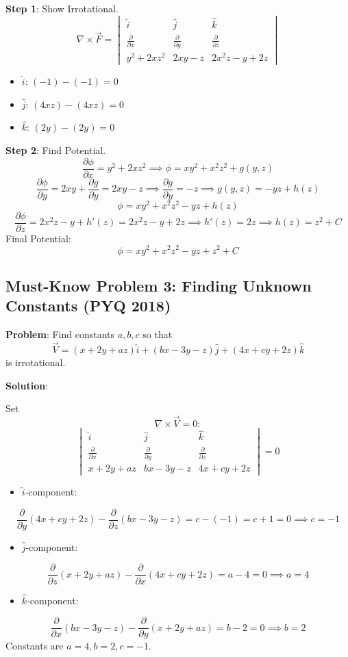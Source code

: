 \documentclass[
]{article}
\providecommand{\tightlist}{%
  \setlength{\itemsep}{0pt}\setlength{\parskip}{0pt}}
\begin{document}
\textbf{Step 1}: Show Irrotational.
\[
\nabla \times \vec{F} =
\begin{vmatrix}
\hat{i} & \hat{j} & \hat{k} \\
\frac{\partial}{\partial x} & \frac{\partial}{\partial y} & \frac{\partial}{\partial z} \\
y^2 + 2xz^2 & 2xy - z & 2x^2z - y + 2z
\end{vmatrix}
\]
\begin{itemize}
\tightlist
\item
  \(\hat{i}\): \((-1) - (-1) = 0\)
\item
  \(\hat{j}\): \((4xz) - (4xz) = 0\)
\item
  \(\hat{k}\): \((2y) - (2y) = 0\)
\end{itemize}

\textbf{Step 2}: Find Potential.
\[
\frac{\partial\phi}{\partial x} = y^2 + 2xz^2 \implies \phi = xy^2 + x^2z^2 + g(y, z)
\]
\[
\frac{\partial\phi}{\partial y} = 2xy + \frac{\partial g}{\partial y} = 2xy - z \implies \frac{\partial g}{\partial y} = -z \implies g(y, z) = -yz + h(z)
\]
\[
\phi = xy^2 + x^2z^2 - yz + h(z)
\]
\[
\frac{\partial\phi}{\partial z} = 2x^2z - y + h'(z) = 2x^2z - y + 2z \implies h'(z) = 2z \implies h(z) = z^2 + C
\]
Final Potential:
\[
\phi = xy^2 + x^2z^2 - yz + z^2 + C
\]

\subsection{Must-Know Problem 3: Finding Unknown Constants (PYQ
2018)}\label{must-know-problem-3-finding-unknown-constants-pyq-2018}

\textbf{Problem}: Find constants \(a, b, c\) so that
\[
\vec{V} = (x + 2y + az)\hat{i} + (bx - 3y - z)\hat{j} + (4x + cy + 2z)\hat{k}
\]
is irrotational.

\textbf{Solution}:

Set
\[
\nabla \times \vec{V} = 0:
\]
\[
\begin{vmatrix}
\hat{i} & \hat{j} & \hat{k} \\
\frac{\partial}{\partial x} & \frac{\partial}{\partial y} & \frac{\partial}{\partial z} \\
x + 2y + az & bx - 3y - z & 4x + cy + 2z
\end{vmatrix} = 0
\]
\begin{itemize}
\tightlist
\item
  \(\hat{i}\)-component:
\end{itemize}
\[
\frac{\partial}{\partial y}(4x + cy + 2z) - \frac{\partial}{\partial z}(bx - 3y - z) = c - (-1) = c + 1 = 0 \implies c = -1
\]
\begin{itemize}
\tightlist
\item
  \(\hat{j}\)-component:
\end{itemize}
\[
\frac{\partial}{\partial z}(x + 2y + az) - \frac{\partial}{\partial x}(4x + cy + 2z) = a - 4 = 0 \implies a = 4
\]
\begin{itemize}
\tightlist
\item
  \(\hat{k}\)-component:
\end{itemize}
\[
\frac{\partial}{\partial x}(bx - 3y - z) - \frac{\partial}{\partial y}(x + 2y + az) = b - 2 = 0 \implies b = 2
\]
Constants are \(a = 4, b = 2, c = -1\).
\end{document}
